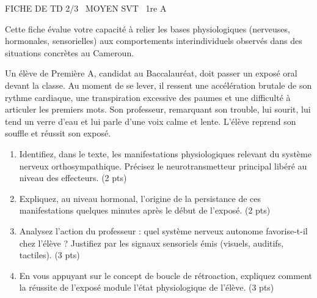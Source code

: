 \documentclass[11pt]{article}
\begin{document}
\begin{tcolorbox}[enhanced,colback=popink,colframe=popink,arc=10pt,boxrule=0pt,left=12pt,right=12pt,top=9pt,bottom=9pt]
{\color{white}\popxbold\small FICHE DE TD 2/3 \textbullet\ MOYEN \hfill SVT \textbullet\ 1re A\par}
\end{tcolorbox}
\vspace{4pt}
Cette fiche évalue votre capacité à relier les bases physiologiques (nerveuses, hormonales, sensorielles) aux comportements interindividuels observés dans des situations concrètes au Cameroun.

\begin{exercice}
\label{exo:stress_classe}
Un élève de Première A, candidat au Baccalauréat, doit passer un exposé oral devant la classe. Au moment de se lever, il ressent une accélération brutale de son rythme cardiaque, une transpiration excessive des paumes et une difficulté à articuler les premiers mots. Son professeur, remarquant son trouble, lui sourit, lui tend un verre d'eau et lui parle d'une voix calme et lente. L'élève reprend son souffle et réussit son exposé.
\begin{enumerate}
    \item Identifiez, dans le texte, les manifestations physiologiques relevant du système nerveux orthosympathique. Précisez le neurotransmetteur principal libéré au niveau des effecteurs. \hfill (2 pts)
    \item Expliquez, au niveau hormonal, l'origine de la persistance de ces manifestations quelques minutes après le début de l'exposé. \hfill (2 pts)
    \item Analysez l'action du professeur : quel système nerveux autonome favorise-t-il chez l'élève ? Justifiez par les signaux sensoriels émis (visuels, auditifs, tactiles). \hfill (3 pts)
    \item En vous appuyant sur le concept de \og\thinspace{}boucle de rétroaction\thinspace{}\fg{}, expliquez comment la réussite de l'exposé module l'état physiologique de l'élève. \hfill (3 pts)
\end{enumerate}
\end{exercice}
\end{document}
